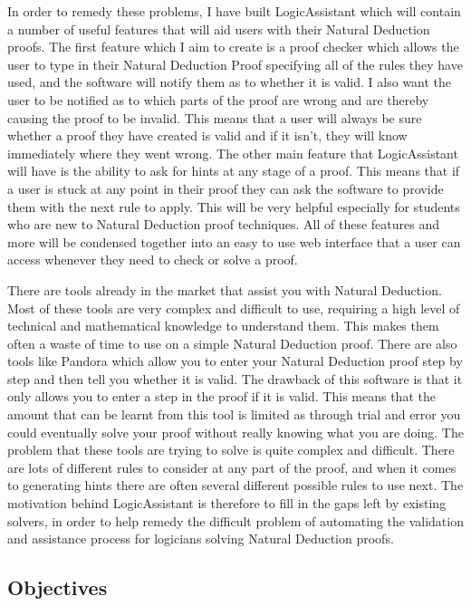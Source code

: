 In order to remedy these problems, I have built LogicAssistant which will contain a number of useful features that will aid users with their Natural Deduction proofs. The first feature which I aim to create is a proof checker which allows the user to type in their Natural Deduction Proof specifying all of the rules they have used, and the software will notify them as to whether it is valid. I also want the user to be notified as to which parts of the proof are wrong and are thereby causing the proof to be invalid. This means that a user will always be sure whether a proof they have created is valid and if it isn't, they will know immediately where they went wrong. The other main feature that LogicAssistant will have is the ability to ask for hints at any stage of a proof. This means that if a user is stuck at any point in their proof they can ask the software to provide them with the next rule to apply. This will be very helpful especially for students who are new to Natural Deduction proof techniques. All of these features and more will be condensed together into an easy to use web interface that a user can access whenever they need to check or solve a proof. 

There are tools already in the market that assist you with Natural Deduction. Most of these tools are very complex and difficult to use, requiring a high level of technical and mathematical knowledge to understand them. This makes them often a waste of time to use on a simple Natural Deduction proof. There are also tools like Pandora\cite{pandora} which allow you to enter your Natural Deduction proof step by step and then tell you whether it is valid. The drawback of this software is that it only allows you to enter a step in the proof if it is valid. This means that the amount that can be learnt from this tool is limited as through trial and error you could eventually solve your proof without really knowing what you are doing. The problem that these tools are trying to solve is quite complex and difficult. There are lots of different rules to consider at any part of the proof, and when it comes to generating hints there are often several different possible rules to use next. The motivation behind LogicAssistant is therefore to fill in the gaps left by existing solvers, in order to help remedy the difficult problem of automating the validation and assistance process for logicians solving Natural Deduction proofs.

\subsection{Objectives \label{objectives}}

